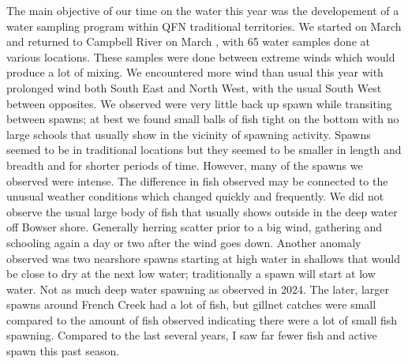 The main objective of our time on the water this year was
the developement of a water sampling program within QFN traditional territories.
We started on March  and returned to Campbell River on March ,
with 65 water samples done at various locations.
These samples were done between extreme winds
which would produce a lot of mixing.
We encountered more wind than usual this year with prolonged wind both
South East and North West, with the usual South West between opposites.
We observed were very little back up spawn while transiting between spawns;
at best we found small balls of fish tight on the bottom with no large schools
that usually show in the vicinity of spawning activity.
Spawns seemed to be in traditional locations but
they seemed to be smaller in length and breadth and for shorter periods of time.
However, many of the spawns we observed were intense.
The difference in fish observed may be connected to
the unusual weather conditions which changed quickly and frequently.
We did not observe the usual large body of fish that
usually shows outside in the deep water off Bowser shore.
Generally herring scatter prior to a big wind,
gathering and schooling again a day or two after the wind goes down.
Another anomaly observed was two nearshore spawns
starting at high water in shallows
that would be close to dry at the next low water;
traditionally a spawn will start at low water.
Not as much deep water spawning as observed in 2024.
The later, larger spawns around French Creek had a lot of fish,
but gillnet catches were small compared to the amount of fish observed
indicating there were a lot of small fish spawning.
Compared to the last several years,
I saw far fewer fish and active spawn this past season.
